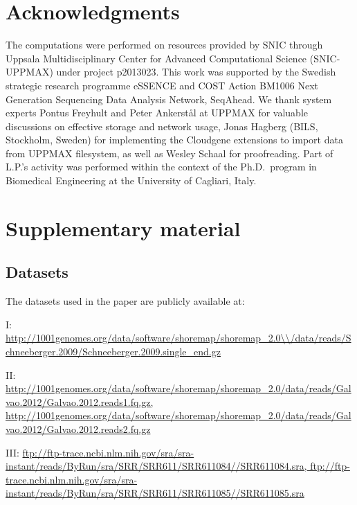 \documentclass[10pt]{article}
\begin{document}
\section*{Acknowledgments}
The computations were performed on resources provided by SNIC through Uppsala Multidisciplinary Center for Advanced Computational Science (SNIC-UPPMAX) under project p2013023. This work was supported by the Swedish strategic research programme eSSENCE and COST Action BM1006 Next Generation Sequencing Data Analysis Network, SeqAhead.
We thank system experts Pontus Freyhult and Peter Ankerst{\aa}l at UPPMAX for valuable discussions on effective storage and network usage, Jonas Hagberg (BILS, Stockholm, Sweden) for implementing the Cloudgene extensions to import data from UPPMAX filesystem, as well as Wesley Schaal for proofreading.
Part of L.P.'s activity was performed within the context of the Ph.D.\ program in
Biomedical Engineering at the University of Cagliari, Italy.





\section*{Supplementary material}

\subsection*{Datasets}

The datasets used in the paper are publicly available at:

I: \url{http://1001genomes.org/data/software/shoremap/shoremap\_2.0\\/data/reads/Schneeberger.2009/Schneeberger.2009.single\_end.gz}

II: \url{http://1001genomes.org/data/software/shoremap/shoremap\_2.0/data/reads/Galvao.2012/Galvao.2012.reads1.fq.gz, http://1001genomes.org/data/software/shoremap/shoremap\_2.0/data/reads/Galvao.2012/Galvao.2012.reads2.fq.gz}	

III: \url{ftp://ftp-trace.ncbi.nlm.nih.gov/sra/sra-instant/reads/ByRun/sra/SRR/SRR611/SRR611084//SRR611084.sra, ftp://ftp-trace.ncbi.nlm.nih.gov/sra/sra-instant/reads/ByRun/sra/SRR/SRR611/SRR611085//SRR611085.sra}
\end{document}
